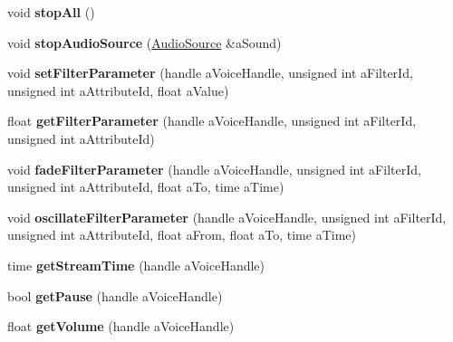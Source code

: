 \begin{DoxyCompactItemize}
\mbox{\label{class_so_loud_1_1_soloud_ab1fa4f692ae99cc1fac597d67958c1ce}} 
void {\bfseries stop\+All} ()
\item 
\mbox{\label{class_so_loud_1_1_soloud_ab0079b4ee6360bceff408df9c2bee634}} 
void {\bfseries stop\+Audio\+Source} (\mbox{\hyperlink{class_so_loud_1_1_audio_source}{Audio\+Source}} \&a\+Sound)
\item 
\mbox{\label{class_so_loud_1_1_soloud_af9871d1329e2d5613d99ff34c17e1ea2}} 
void {\bfseries set\+Filter\+Parameter} (handle a\+Voice\+Handle, unsigned int a\+Filter\+Id, unsigned int a\+Attribute\+Id, float a\+Value)
\item 
\mbox{\label{class_so_loud_1_1_soloud_a83072ac27d31de55084c6160eecfa72f}} 
float {\bfseries get\+Filter\+Parameter} (handle a\+Voice\+Handle, unsigned int a\+Filter\+Id, unsigned int a\+Attribute\+Id)
\item 
\mbox{\label{class_so_loud_1_1_soloud_a342a6968934617d9b38fa380f9dbf512}} 
void {\bfseries fade\+Filter\+Parameter} (handle a\+Voice\+Handle, unsigned int a\+Filter\+Id, unsigned int a\+Attribute\+Id, float a\+To, time a\+Time)
\item 
\mbox{\label{class_so_loud_1_1_soloud_ab422df9ba2b61c6453347ee99307b490}} 
void {\bfseries oscillate\+Filter\+Parameter} (handle a\+Voice\+Handle, unsigned int a\+Filter\+Id, unsigned int a\+Attribute\+Id, float a\+From, float a\+To, time a\+Time)
\item 
\mbox{\label{class_so_loud_1_1_soloud_a86cd9de7f52d7a0fa3f59e840a914d1e}} 
time {\bfseries get\+Stream\+Time} (handle a\+Voice\+Handle)
\item 
\mbox{\label{class_so_loud_1_1_soloud_a01f9dbaf2cde0de348936d8ff0761de6}} 
bool {\bfseries get\+Pause} (handle a\+Voice\+Handle)
\item 
\mbox{\label{class_so_loud_1_1_soloud_a6aea2e6c7619dbcb087cd2536560498d}} 
float {\bfseries get\+Volume} (handle a\+Voice\+Handle)

\end{DoxyCompactItemize}
